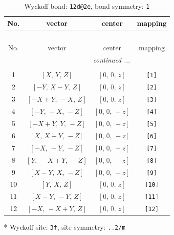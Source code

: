 \documentclass[fleqn,8pt]{jsarticle}
\begin{document}
\begin{longtable}{cccc}
\caption{Wyckoff bond: {\tt 12d@2e}, bond symmetry: {\tt 1}}
 \\
 \hline \hline
No. & vector & center & mapping \\ \hline \endfirsthead

\multicolumn{3}{l}{\tablename\ \thetable{}} \\
 \hline \hline
No. & vector & center & mapping \\ \hline \endhead

 \hline \hline
\multicolumn{3}{r}{\footnotesize\it continued ...} \\ \endfoot

 \hline \hline
\multicolumn{3}{r}{} \\ \endlastfoot

1 & $\left[ X,\, Y,\, Z \right]$ & $\left[ 0,\, 0,\, z \right]$ & {\tt [1]} \\ \hline
2 & $\left[ - Y,\, X - Y,\, Z \right]$ & $\left[ 0,\, 0,\, z \right]$ & {\tt [2]} \\ \hline
3 & $\left[ - X + Y,\, - X,\, Z \right]$ & $\left[ 0,\, 0,\, z \right]$ & {\tt [3]} \\ \hline
4 & $\left[ - Y,\, - X,\, - Z \right]$ & $\left[ 0,\, 0,\, - z \right]$ & {\tt [4]} \\ \hline
5 & $\left[ - X + Y,\, Y,\, - Z \right]$ & $\left[ 0,\, 0,\, - z \right]$ & {\tt [5]} \\ \hline
6 & $\left[ X,\, X - Y,\, - Z \right]$ & $\left[ 0,\, 0,\, - z \right]$ & {\tt [6]} \\ \hline
7 & $\left[ - X,\, - Y,\, - Z \right]$ & $\left[ 0,\, 0,\, - z \right]$ & {\tt [7]} \\ \hline
8 & $\left[ Y,\, - X + Y,\, - Z \right]$ & $\left[ 0,\, 0,\, - z \right]$ & {\tt [8]} \\ \hline
9 & $\left[ X - Y,\, X,\, - Z \right]$ & $\left[ 0,\, 0,\, - z \right]$ & {\tt [9]} \\ \hline
10 & $\left[ Y,\, X,\, Z \right]$ & $\left[ 0,\, 0,\, z \right]$ & {\tt [10]} \\ \hline
11 & $\left[ X - Y,\, - Y,\, Z \right]$ & $\left[ 0,\, 0,\, z \right]$ & {\tt [11]} \\ \hline
12 & $\left[ - X,\, - X + Y,\, Z \right]$ & $\left[ 0,\, 0,\, z \right]$ & {\tt [12]} \\
\end{longtable}
* Wyckoff site: {\tt 3f}, site symmetry: {\tt ..2/m}
\renewcommand{\arraystretch}{1.2}
\end{document}
